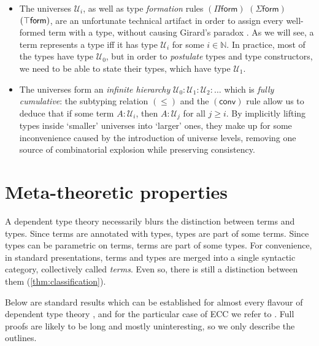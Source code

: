 \documentclass[twoside]{report}
\begin{document}
\begin{itemize}
    \item The universes $\mathcal U_i$, as well as type \emph{formation} rules $(\Pi\mathsf{form})$ $(\Sigma\mathsf{form})$ $(\top\mathsf{form})$, are an unfortunate technical artifact in order to assign every well-formed term with a type, without causing Girard's paradox \cite{girard1972interpretation}. As we will see, a term represents a type iff it has type $\mathcal U_i$ for some $i\in\mathbb N$. In practice, most of the types have type $\mathcal U_0$, but in order to \emph{postulate} types and type constructors, we need to be able to state their types, which have type $\mathcal U_1$.

    \item The universes form an \emph{infinite hierarchy} $\mathcal U_0 : \mathcal U_1 : \mathcal U_2 : \ldots$ which is \emph{fully cumulative}: the subtyping relation $(\leq)$ and the $(\mathsf{conv})$ rule allow us to deduce that if some term $A : \mathcal U_i$, then $A : \mathcal U_j$ for all $j \geq i$. By implicitly lifting types inside `smaller' universes into `larger' ones, they make up for some inconvenience caused by the introduction of universe levels, removing one source of combinatorial explosion while preserving consistency.
\end{itemize}

\section{Meta-theoretic properties}
\label{sec:type_theory_standard_properties}

A dependent type theory necessarily blurs the distinction between terms and types. Since terms are annotated with types, types are part of some terms. Since types can be parametric on terms, terms are part of some types. For convenience, in standard presentations, terms and types are merged into a single syntactic category, collectively called \emph{terms}. Even so, there is still a distinction between them (\cref{thm:classification}).

Below are standard results which can be established for almost every flavour of dependent type theory \cite{harper1993framework,pym1990proofs,elliott1990extensions}, and for the particular case of ECC we refer to \cite{luo1990extended}. Full proofs are likely to be long and mostly uninteresting, so we only describe the outlines.
\end{document}
